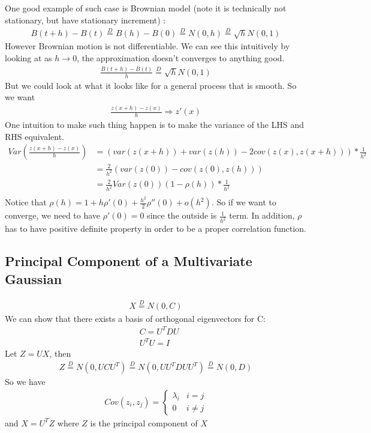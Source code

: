 One good example of such case is Brownian model (note it is technically not stationary, but have stationary increment) : 
    \begin{align*}
        B(t+h) - B(t) \overset{D}{=} B(h) - B(0) \overset{D}{=}  N(0, h) \overset{D}{=} \sqrt{h}N(0,1)
    \end{align*}
However Brownian motion is not differentiable. We can see this intuitively by looking at as $h\to 0$, the approximation doesn't converges to anything good. 
    \begin{align*}
        \frac{ B(t+h) - B(t)}{h} \overset{D}{=} \sqrt{h} N(0,1)
    \end{align*}
But we could look at what it looks like for a general process that is smooth. So we want 
    \begin{align*}
        \frac{z(x+h) - z(x)}{h}\Rightarrow z'(x)
    \end{align*}
One intuition to make such thing happen is to make the variance of the LHS and RHS equivalent. 
    \begin{align*}
        Var(\frac{z(x+h) - z(x)}{h})
        & = (var(z(x+h)) + var(z(h)) - 2cov(z(x), z(x+h))) * \frac{1}{h^2}\\
        & = \frac{2}{h^2}(var(z(0)) - cov(z(0), z(h))) \tag{stationary property} \\
        & = \frac{2}{h^2}Var(z(0))(1 - \rho(h))*\frac{1}{h^2}\\
    \end{align*}
Notice that $\rho(h) = 1 + h \rho'(0) + \frac{h^2}{2}\rho''(0) + o(h^2)$. So if we want to converge, we need to have $\rho'(0)=0$ since the outside is $\frac{1}{h^2}$ term. In addition, $\rho$ has to have positive definite property in order to be a proper correlation function. 

\subsection{Principal Component of a Multivariate Gaussian}
    \begin{align*}
        X \overset{D}{=}N(0,C) \tag{$C$ is positive definite symmetric}
    \end{align*}
We can show that there exists a basis of orthogonal eigenvectors for C: 
    \begin{align*}
        & C = U^TDU \\
        & U^TU = I
    \end{align*}
Let $Z=UX$, then 
    \begin{align*}
        Z \overset{D}{=}N(0, UCU^T) \overset{D}{=}N(0, UU^TDUU^T)\overset{D}{=}N(0, D)
    \end{align*}
So we have 
    \begin{align*}
        Cov(z_i, z_j) = \begin{cases} \lambda_i & i=j \\ 0 & i \neq j\end{cases}
    \end{align*}
and $X=U^TZ$ where $Z$ is the principal component of $X$

